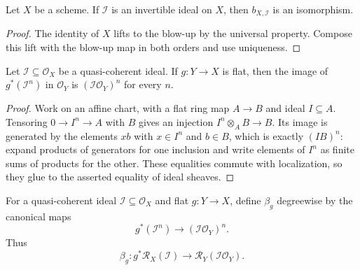 \begin{corollary}
  \label{cor:nagata-blowup-cartier-iso}

  Let $X$ be a scheme.  If $\mathcal I$ is an invertible ideal on $X$, then
  $b_{X,\mathcal I}$ is an isomorphism.
\end{corollary}

\begin{proof}
  The identity of $X$ lifts to the blow-up by the universal property.  Compose
  this lift with the blow-up map in both orders and use uniqueness.
\end{proof}

\begin{lemma}
  \label{lemma:nagata-flat-pullback-ideal-pow}

  Let $\mathcal I\subseteq\mathcal O_X$ be a quasi-coherent ideal.  If
  $g\colon Y\to X$ is flat, then the image of $g^*(\mathcal I^n)$ in
  $\mathcal O_Y$ is $(\mathcal I\mathcal O_Y)^n$ for every $n$.
\end{lemma}

\begin{proof}
  Work on an affine chart, with a flat ring map $A\to B$ and ideal $I\subseteq
  A$.  Tensoring $0\to I^n\to A$ with $B$ gives an injection
  $I^n\otimes_AB\to B$.  Its image is generated by the elements $xb$ with
  $x\in I^n$ and $b\in B$, which is exactly $(IB)^n$: expand products of
  generators for one inclusion and write elements of $I^n$ as finite sums of
  products for the other.  These equalities commute with localization, so
  they glue to the asserted equality of ideal sheaves.
\end{proof}

\begin{definition}
  \label{def:nagata-flat-pullback-rees-map}

  For a quasi-coherent ideal $\mathcal I\subseteq\mathcal O_X$ and flat
  $g\colon Y\to X$, define $\beta_g$ degreewise by the canonical
  maps
  \[
    g^*(\mathcal I^n)\longrightarrow
      (\mathcal I\mathcal O_Y)^n.
  \]
  Thus
  \[
    \beta_g\colon g^*\mathcal R_X(\mathcal I)\longrightarrow
      \mathcal R_Y(\mathcal I\mathcal O_Y).
  \]
\end{definition}

